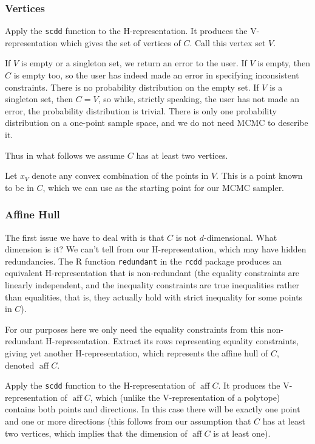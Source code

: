\documentclass[11pt]{article}
\DeclareMathOperator{\aff}{aff}
\begin{document}
\subsubsection{Vertices}

Apply the \texttt{scdd} function to the H-representation.
It produces the V-representation which gives the set of vertices of $C$.
Call this vertex set $V$.

If $V$ is empty or a singleton set, we return an error to the user.
If $V$ is empty, then $C$ is empty too, so the user has indeed made an
error in specifying inconsistent constraints.  There is no probability
distribution on the empty set.
If $V$ is a singleton set, then $C = V$, so while, strictly speaking,
the user has not made an error, the probability distribution is trivial.
There is only one probability distribution on a one-point sample space,
and we do not need MCMC to describe it.

Thus in what follows we assume $C$ has at least two vertices.

Let $x_V$ denote any convex combination of the points in $V$.
This is a point known to be in $C$, which we can use as the starting
point for our MCMC sampler.

\subsubsection{Affine Hull}

The first issue we have to deal with is that $C$ is not $d$-dimensional.
What dimension is it?  We can't tell from our H-representation, which may
have hidden redundancies.  The R function \texttt{redundant}
in the \texttt{rcdd} package produces an equivalent H-representation that
is non-redundant (the equality constraints are linearly independent,
and the inequality constraints are true inequalities rather than equalities,
that is, they actually hold with strict inequality for some points in $C$).

For our purposes here we only need the equality constraints from
this non-redundant H-representation.  Extract its rows
representing equality constraints, giving yet another H-representation,
which represents the affine hull of $C$, denoted $\aff C$.

Apply the \texttt{scdd} function to the H-representation of $\aff C$.
It produces the V-representation of $\aff C$, which (unlike the
V-representation of a polytope) contains both points and directions.
In this case there will be exactly one point and one or more directions
(this follows from our assumption that $C$ has at least two vertices,
which implies that the dimension of $\aff C$ is at least one).
\end{document}
